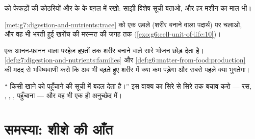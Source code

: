 \begin{exercise}[$\star\star$]\label{exo:g7:digestion-and-nutrients:9}
 को फेफड़ों की कोठरियों और  के  के बग़ल में रखो:
साझी विशेष-सूची बताओ, और हर मशीन का माल भी।
\end{exercise}

\begin{exercise}[$\star\star$]\label{exo:g7:digestion-and-nutrients:10}
\cref{met:g7:digestion-and-nutrients:trace} को एक उबले  (शरीर
बनाने वाला पदार्थ) पर चलाओ, और वह भी भरती हुई खरोंच की मरम्मत की जगह
तक (\cref{exo:g6:cell-unit-of-life:10})।
\end{exercise}

\begin{exercise}[$\star\star$]\label{exo:g7:digestion-and-nutrients:11}
एक आनन-फ़ानन वाला परहेज़ हफ़्तों तक शरीर बनाने वाले सारे भोजन छोड़ देता
है। \cref{def:g7:digestion-and-nutrients:families} और
\cref{def:g6:matter-from-food:production} की मदद से भविष्यवाणी करो कि
अब भी बढ़ते हुए शरीर में क्या कम पड़ेगा और सबसे पहले क्या भुगतेगा।
\end{exercise}

\begin{exercise}[$\star\star\star$]\label{exo:g7:digestion-and-nutrients:12}
`` किसी खाने को पहुँचाने की सूची में बदल देता है।'' इस वाक्य का
सिरे से सिरे तक बचाव करो --- रस, , , , पहुँचाना
--- और वह भी एक ही अनुच्छेद में।
\end{exercise}

\section{समस्या: शीशे की आँत}

